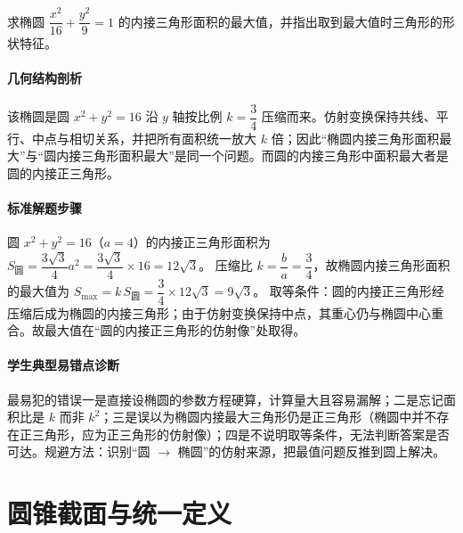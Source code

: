 \begin{problem}
求椭圆 $\dfrac{x^2}{16}+\dfrac{y^2}{9}=1$ 的内接三角形面积的最大值，并指出取到最大值时三角形的形状特征。
\end{problem}
\begin{solution}
\paragraph{几何结构剖析}
该椭圆是圆 $x^2+y^2=16$ 沿 $y$ 轴按比例 $k=\dfrac34$ 压缩而来。仿射变换保持共线、平行、中点与相切关系，并把所有面积统一放大 $k$ 倍；因此“椭圆内接三角形面积最大”与“圆内接三角形面积最大”是同一个问题。而圆的内接三角形中面积最大者是圆的内接正三角形。
\paragraph{标准解题步骤}
圆 $x^2+y^2=16$（$a=4$）的内接正三角形面积为
$S_{\text{圆}}=\dfrac{3\sqrt3}{4}a^2=\dfrac{3\sqrt3}{4}\times16=12\sqrt3$。
压缩比 $k=\dfrac ba=\dfrac34$，故椭圆内接三角形面积的最大值为
$S_{\max}=k\,S_{\text{圆}}=\dfrac34\times12\sqrt3=9\sqrt3$。
取等条件：圆的内接正三角形经压缩后成为椭圆的内接三角形；由于仿射变换保持中点，其重心仍与椭圆中心重合。故最大值在“圆的内接正三角形的仿射像”处取得。
\paragraph{学生典型易错点诊断}
最易犯的错误一是直接设椭圆的参数方程硬算，计算量大且容易漏解；二是忘记面积比是 $k$ 而非 $k^2$；三是误以为椭圆内接最大三角形仍是正三角形（椭圆中并不存在正三角形，应为正三角形的仿射像）；四是不说明取等条件，无法判断答案是否可达。规避方法：识别“圆 $\to$ 椭圆”的仿射来源，把最值问题反推到圆上解决。
\end{solution}

\section{圆锥截面与统一定义}

